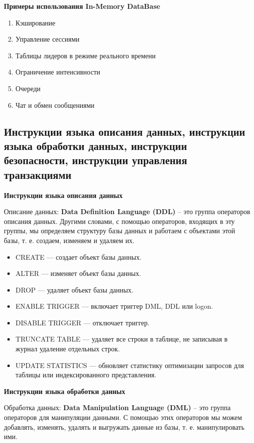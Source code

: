 \textbf{Примеры использования In-Memory DataBase}

\begin{enumerate}
	\item Кэширование
	\item Управление сессиями
	\item Таблицы лидеров в режиме реального времени
	\item Ограничение интенсивности
	\item Очереди
	\item Чат и обмен сообщениями
\end{enumerate}
 
 
\newpage

\subsection{Инструкции языка описания данных, инструкции языка обработки данных, инструкции безопасности, инструкции управления транзакциями}

\textbf{Инструкции языка описания данных}

Описание данных: \textbf{Data Definition Language (DDL)}
– это группа операторов описания данных. Другими словами, с помощью операторов, входящих в эту группы, мы определяем структуру базы данных и работаем с объектами этой базы, т. е. создаем, изменяем и удаляем их.
\begin{itemize}
	\item CREATE — создает объект базы данных. 
	\item ALTER — изменяет объект базы данных.
	\item DROP — удаляет объект базы данных. 
	\item ENABLE TRIGGER — включает триггер DML, DDL или logon. 
	\item DISABLE TRIGGER — отключает триггер. 
	\item TRUNCATE TABLE — удаляет все строки в таблице, не записывая в журнал удаление отдельных строк. 
	\item UPDATE STATISTICS — обновляет статистику оптимизации запросов для таблицы или индексированного представления.
\end{itemize}

\textbf{Инструкции языка обработки данных}

Обработка данных: \textbf{Data Manipulation Language (DML)} – это группа операторов для манипуляции данными. С помощью этих операторов мы можем добавлять, изменять, удалять и выгружать данные из базы, т. е. манипулировать ими.

